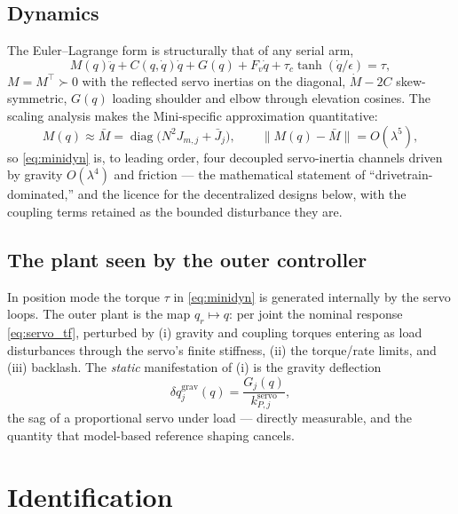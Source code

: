\documentclass[conference]{IEEEtran}
\newcommand{\diag}{\operatorname{diag}}
\begin{document}
\subsection{Dynamics}
The Euler--Lagrange form is structurally that of any serial arm,
\begin{equation}
M(q)\ddot q + C(q,\dot q)\dot q + G(q) + F_v\dot q + \tau_c\tanh(\dot q/\epsilon) = \tau,
\label{eq:minidyn}
\end{equation}
$M = M^{\!\top}\succ0$ with the reflected servo inertias on the diagonal, $\dot M - 2C$ skew-symmetric, $G(q)$ loading shoulder and elbow through elevation cosines. The scaling analysis makes the Mini-specific approximation quantitative:
\begin{equation}
M(q) \approx \bar M = \diag\bigl(N^2 J_{m,j} + \bar J_j\bigr),\qquad
\|M(q) - \bar M\| = O(\lambda^5),
\end{equation}
so \eqref{eq:minidyn} is, to leading order, four decoupled servo-inertia channels driven by gravity $O(\lambda^4)$ and friction --- the mathematical statement of ``drivetrain-dominated,'' and the licence for the decentralized designs below, with the coupling terms retained as the bounded disturbance they are.

\subsection{The plant seen by the outer controller}
In position mode the torque $\tau$ in \eqref{eq:minidyn} is generated internally by the servo loops. The outer plant is the map $q_r \mapsto q$: per joint the nominal response \eqref{eq:servo_tf}, perturbed by (i) gravity and coupling torques entering as load disturbances through the servo's finite stiffness, (ii) the torque/rate limits, and (iii) backlash. The \emph{static} manifestation of (i) is the gravity deflection
\begin{equation}
\delta q_j^{\mathrm{grav}}(q) = \frac{G_j(q) }{k_{P,j}^{\mathrm{servo}}},
\label{eq:sag}
\end{equation}
the sag of a proportional servo under load --- directly measurable, and the quantity that model-based reference shaping cancels.

\section{Identification}
\end{document}
